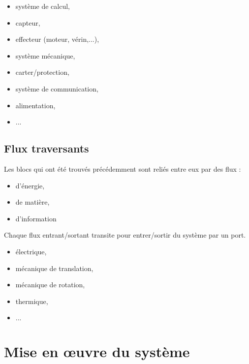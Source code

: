 \begin{itemize}
 \item système de calcul,
 \item capteur,
 \item effecteur (moteur, vérin,...),
 \item système mécanique,
 \item carter/protection,
 \item système de communication,
 \item alimentation,
 \item ...
\end{itemize}

\subsection{Flux traversants}

Les blocs qui ont été trouvés précédemment sont reliés entre eux par des flux :
\begin{itemize}
 \item d'énergie,
 \item de matière,
 \item d'information
\end{itemize}


Chaque flux entrant/sortant transite pour entrer/sortir du système par un port.


\begin{itemize}
 \item électrique,
 \item mécanique de translation,
 \item mécanique de rotation,
 \item thermique,
 \item ...
\end{itemize}

\section{Mise en \oe uvre du système}

